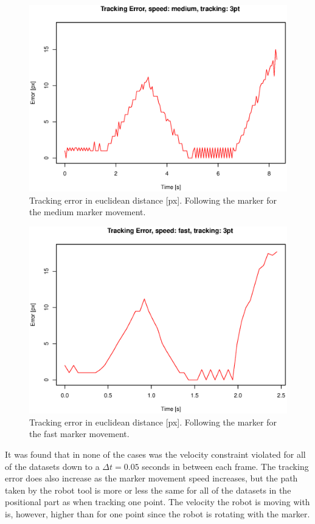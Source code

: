 \begin{figure}[H]
\centering
\includegraphics[width= \fullImageWidth]{graphics/robotics/trackingError_medium_3pt}
\caption{Tracking error in euclidean distance [px].
Following the marker for the medium marker movement.}
\label{fig:trackingerror_medium_3p}
\end{figure}

\begin{figure}[H]
\centering
\includegraphics[width= \fullImageWidth]{graphics/robotics/trackingError_fast_3pt}
\caption{Tracking error in euclidean distance [px].
Following the marker for the fast marker movement.}
\label{fig:trackingerror_fast_3p}
\end{figure}

It was found that in none of the cases was the velocity constraint violated for all of the datasets down to a $\Delta t = 0.05$ seconds in between each frame.
The tracking error does also increase as the marker movement speed increases, but the path taken by the robot tool is more or less the same for all of the datasets in the positional part as when tracking one point.
The velocity the robot is moving with is, however, higher than for one point since the robot is rotating with the marker.

